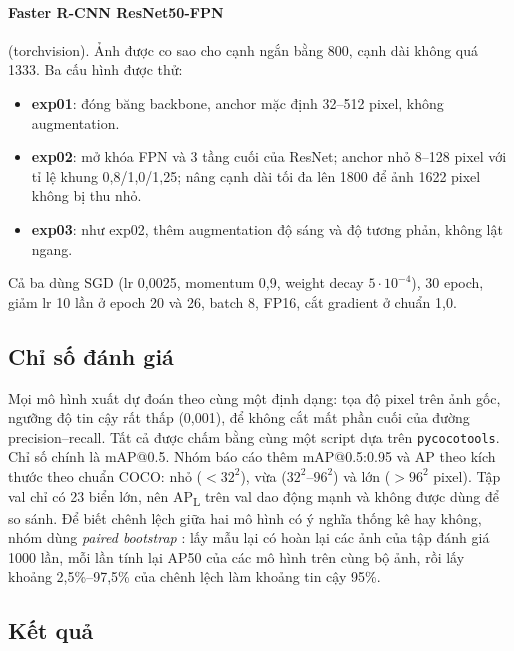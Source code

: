 \paragraph{Faster R-CNN ResNet50-FPN} \citep{ren2015faster,lin2017fpn} (torchvision).
Ảnh được co sao cho cạnh ngắn bằng 800, cạnh dài không quá 1333. Ba cấu hình được thử:
\begin{itemize}
\item \textbf{exp01}: đóng băng backbone, anchor mặc định 32--512 pixel, không augmentation.
\item \textbf{exp02}: mở khóa FPN và 3 tầng cuối của ResNet; anchor nhỏ 8--128 pixel với tỉ lệ khung 0,8/1,0/1,25; nâng cạnh dài tối đa lên 1800 để ảnh 1622 pixel không bị thu nhỏ.
\item \textbf{exp03}: như exp02, thêm augmentation độ sáng và độ tương phản, không lật ngang.
\end{itemize}
Cả ba dùng SGD (lr 0,0025, momentum 0,9, weight decay $5 \cdot 10^{-4}$), 30 epoch, giảm lr 10 lần ở epoch 20 và 26, batch 8, FP16, cắt gradient ở chuẩn 1,0.

\subsection{Chỉ số đánh giá}
\label{sec:metrics}

Mọi mô hình xuất dự đoán theo cùng một định dạng: tọa độ pixel trên ảnh gốc, ngưỡng độ tin cậy rất thấp (0,001), để không cắt mất phần cuối của đường precision--recall.
Tất cả được chấm bằng cùng một script dựa trên \texttt{pycocotools}.
Chỉ số chính là mAP@0.5. Nhóm báo cáo thêm mAP@0.5:0.95 và AP theo kích thước theo chuẩn COCO: nhỏ ($< 32^2$), vừa ($32^2$--$96^2$) và lớn ($> 96^2$ pixel).
Tập val chỉ có 23 biển lớn, nên AP\textsubscript{L} trên val dao động mạnh và không được dùng để so sánh.
Để biết chênh lệch giữa hai mô hình có ý nghĩa thống kê hay không, nhóm dùng \emph{paired bootstrap} \citep{efron1993bootstrap}: lấy mẫu lại có hoàn lại các ảnh của tập đánh giá 1000 lần, mỗi lần tính lại AP50 của các mô hình trên cùng bộ ảnh, rồi lấy khoảng 2,5\%--97,5\% của chênh lệch làm khoảng tin cậy 95\%.

\subsection{Kết quả}
\label{sec:results}

